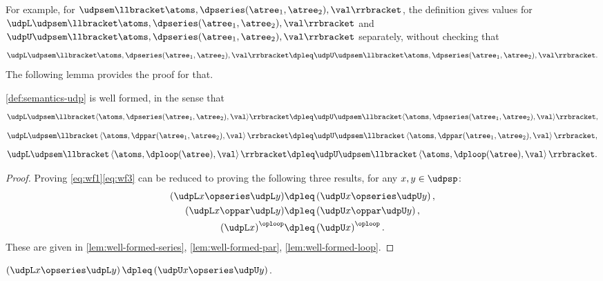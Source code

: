 For example, for $\udpsem\llbracket\atoms,\dpseries(\atree_{1},\atree_{2}),\val\rrbracket$,
the definition gives values for~$\udpL\udpsem\llbracket\atoms,\dpseries(\atree_{1},\atree_{2}),\val\rrbracket$
and~$\udpU\udpsem\llbracket\atoms,\dpseries(\atree_{1},\atree_{2}),\val\rrbracket$
separately, without checking that
\[
\udpL\udpsem\llbracket\atoms,\dpseries(\atree_{1},\atree_{2}),\val\rrbracket\dpleq\udpU\udpsem\llbracket\atoms,\dpseries(\atree_{1},\atree_{2}),\val\rrbracket.
\]
 The following lemma provides the proof for that.
\begin{lemma}
\label{lem:udpsem-well-formed}\cref{def:semantics-udp} is well
formed, in the sense that {\small{}
\begin{equation}
\udpL\udpsem\llbracket\langle\atoms,\dpseries(\atree_{1},\atree_{2}),\val\rangle\rrbracket\dpleq\udpU\udpsem\llbracket\langle\atoms,\dpseries(\atree_{1},\atree_{2}),\val\rangle\rrbracket,\label{eq:wf1}
\end{equation}
\begin{equation}
\udpL\udpsem\llbracket\left\langle \atoms,\dppar(\atree_{1},\atree_{2}),\val\right\rangle \rrbracket\dpleq\udpU\udpsem\llbracket\left\langle \atoms,\dppar(\atree_{1},\atree_{2}),\val\right\rangle \rrbracket,\label{eq:wf2}
\end{equation}
\begin{equation}
\udpL\udpsem\llbracket\left\langle \atoms,\dploop(\atree),\val\right\rangle \rrbracket\dpleq\udpU\udpsem\llbracket\left\langle \atoms,\dploop(\atree),\val\right\rangle \rrbracket.\label{eq:wf3}
\end{equation}
}{\small \par}
\end{lemma}
\begin{proof}
Proving \cref{eq:wf1}\textemdash \cref{eq:wf3} can be
reduced to proving the following three results, for any $x,y\in\udpsp$:
\begin{align*}
\left(\udpL x\opseries\udpL y\right) & \dpleq\left(\udpU x\opseries\udpU y\right),\\
\left(\udpL x\oppar\udpL y\right) & \dpleq\left(\udpU x\oppar\udpU y\right),\\
\left(\udpL x\right)^{\oploop} & \dpleq\left(\udpU x\right)^{\oploop}.
\end{align*}
These are given in \cref{lem:well-formed-series}, \cref{lem:well-formed-par},
\cref{lem:well-formed-loop}.
\end{proof}
\begin{lemma}
\label{lem:well-formed-series}$\left(\udpL x\opseries\udpL y\right)\dpleq\left(\udpU x\opseries\udpU y\right)$.
\end{lemma}
